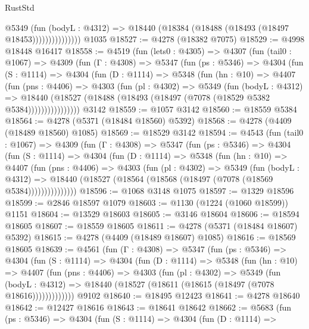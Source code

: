 \begin{lexlean}{RustStd}
\begin{coremodule}
{\begin{coremodule}
{{{{{{{{{{{{{{{{{{{{{{{{{{{{{{{{{{{                      @5349
                        (fun (bodyL : @4312) =>
                        @18440 (@18384 (@18488 (@18493 (@18497 @18453)))))))))))))))
    @1035
@18527 := @4278 (@18382 @7075)
@18529 := @4998 @18448 @16417
@18558 := @4519
    (fun (lets0 : @4305) =>
    @4307
      (fun (tail0 : @1067) =>
      @4309
        (fun (Γ : @4308) =>
        @5347
          (fun (ps : @5346) =>
          @4304
            (fun (S : @1114) =>
            @4304
              (fun (D : @1114) =>
              @5348
                (fun (hn : @10) =>
                @4407
                  (fun (pns : @4406) =>
                  @4303
                    (fun (pl : @4302) =>
                    @5349
                      (fun (bodyL : @4312) =>
                      @18440
                        (@18527 (@18488 (@18493 (@18497 (@7078 (@18529 @5382 @5384))))))))))))))))
    @3142
@18559 := @1057 @3142
@18560 := @18559 @5384
@18564 := @4278 (@5371 (@18484 @18560) @5392)
@18568 := @4278 (@4409 (@18489 @18560) @1085)
@18569 := @18529 @3142
@18594 := @4543
    (fun (tail0 : @1067) =>
    @4309
      (fun (Γ : @4308) =>
      @5347
        (fun (ps : @5346) =>
        @4304
          (fun (S : @1114) =>
          @4304
            (fun (D : @1114) =>
            @5348
              (fun (hn : @10) =>
              @4407
                (fun (pns : @4406) =>
                @4303
                  (fun (pl : @4302) =>
                  @5349
                    (fun (bodyL : @4312) =>
                    @18440 (@18527 (@18564 (@18568 (@18497 (@7078 (@18569 @5384)))))))))))))))
@18596 := @1068 @3148 @1075
@18597 := @1329 @18596
@18599 := @2846 @18597 @1079
@18603 := @1130 (@1224 (@1060 @18599)) @1151
@18604 := @13529 @18603
@18605 := @3146 @18604
@18606 := @18594 @18605
@18607 := @18559 @18605
@18611 := @4278 (@5371 (@18484 @18607) @5392)
@18615 := @4278 (@4409 (@18489 @18607) @1085)
@18616 := @18569 @18605
@18639 := @4561
    (fun (Γ : @4308) =>
    @5347
      (fun (ps : @5346) =>
      @4304
        (fun (S : @1114) =>
        @4304
          (fun (D : @1114) =>
          @5348
            (fun (hn : @10) =>
            @4407
              (fun (pns : @4406) =>
              @4303
                (fun (pl : @4302) =>
                @5349
                  (fun (bodyL : @4312) =>
                  @18440 (@18527 (@18611 (@18615 (@18497 (@7078 @18616)))))))))))))
    @9102
@18640 := @18495 @12423
@18641 := @4278 @18640
@18642 := @12427 @18616
@18643 := @18641 @18642
@18662 := @5683
    (fun (ps : @5346) =>
    @4304
      (fun (S : @1114) =>
      @4304
        (fun (D : @1114) =>
}}}}}}}}}}}}}}}}}}}}}}}}}}}}}}}}}}}
\end{coremodule}}
\end{coremodule}
\end{lexlean}
